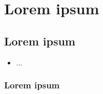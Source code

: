 \afterpage{\blankpage}
\chapter{Lorem ipsum}\label{chap:ctfad}
\setcounter{page}{5}

\section{Lorem ipsum}

\begin{itemize}
    \setlength{\itemsep}{2pt}
    \setlength{\parskip}{2pt}
    \item ...
\end{itemize}

\subsection{Lorem ipsum}

